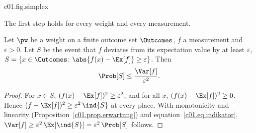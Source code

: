 \begin{vertiefung}
  \begin{tpcfigure}{c01.fig.simplex}

    \caption{The set of all weights. (a) Two outcomes: the segment between the point
      weights $\pw_1 = (1,0)$ and $\pw_2 = (0,1)$ in the plane of the coordinates
      $\pw(1)$, $\pw(2)$; marked is $\pw = (\tfrac14, \tfrac34)$. (b) Three
      outcomes: a triangle with the point weights as corners. Marked are the uniform
      weight $(\tfrac13, \tfrac13, \tfrac13)$ at the centroid and the weight
      $(\tfrac12, \tfrac13, \tfrac16)$, which lies closer to $\pw_1$. Filled points are
      point weights, open circles proper mixtures.}
  \end{tpcfigure}
\end{vertiefung}

\begin{vertiefung}[id=c01.v2,
    titel={How close are relative frequencies to the probabilities?},
    wozu={The Core restricts the statistical reading to independent repetitions of the
      same preparation. Here an upper bound on the probability of a deviation of the
      relative frequency by at least $\varepsilon > 0$ is proved; this bound decreases
      with the positive integer number of repetitions.},
    voraussetzung={Sections~\ref{c01.s2} and~\ref{c01.s3} up to
      equation~\eqref{c01.eq.var-indikator}. The rest of the course uses only the result
      in words.},
    zurueck={The probability that the relative frequency of an event after $N$ independent
      repetitions deviates from its probability by at least $\varepsilon$ is at most
      $1/(4N\varepsilon^2)$.}]
  The first step holds for every weight and every measurement.

  \begin{lemma}\label{c01.lem.tschebyscheff}
    Let $\pw$ be a weight on a finite outcome set $\Outcomes$, $f$ a measurement
    and $\varepsilon > 0$. Let $S$ be the event that $f$ deviates from its expectation
    value by at least $\varepsilon$,
    $S = \{x \in \Outcomes \colon \abs{f(x) - \Ex[f]} \geq \varepsilon\}$. Then
    \begin{equation}\label{c01.eq.tschebyscheff}
      \Prob[S] \leq \frac{\Var[f]}{\varepsilon^2} .
    \end{equation}
  \end{lemma}
  \begin{proof}
    For $x \in S$, $(f(x) - \Ex[f])^2 \geq \varepsilon^2$, and for all $x$,
    $(f(x) - \Ex[f])^2 \geq 0$. Hence $(f - \Ex[f])^2 \geq \varepsilon^2\, \ind{S}$ at
    every place. With monotonicity and linearity (Proposition~\ref{c01.prop.erwartung}) and
    equation~\eqref{c01.eq.indikator},
    $\Var[f] \geq \varepsilon^2\, \Ex[\ind{S}] = \varepsilon^2\, \Prob[S]$ follows.
  \end{proof}


\end{vertiefung}
